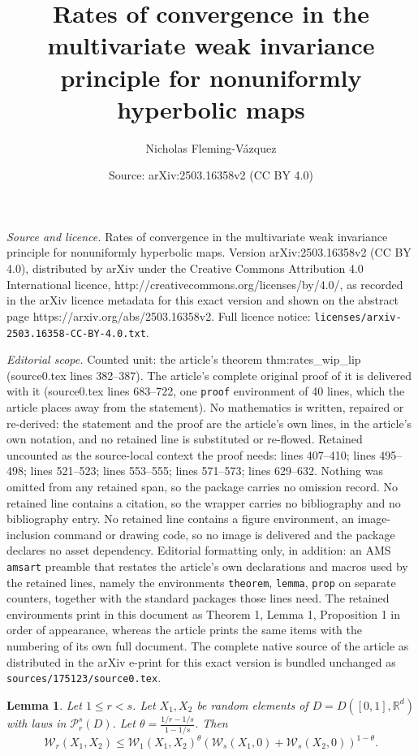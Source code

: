 \documentclass[10pt,a4paper]{amsart}
\title{Rates of convergence in the multivariate weak invariance principle for nonuniformly hyperbolic maps}
\author{Nicholas Fleming-V\'azquez}
\date{Source: arXiv:2503.16358v2 (CC BY 4.0)}
\newtheorem{lemma}{Lemma}
\newcommand{\R}{\ensuremath{\mathbb{R}}}%
\newcommand{\wass}{\mathcal{W}}
\begin{document}
\maketitle

\noindent\emph{Source and licence.} Rates of convergence in the multivariate weak invariance principle for nonuniformly hyperbolic maps. Version arXiv:2503.16358v2 (CC BY 4.0), distributed by arXiv under the Creative Commons Attribution 4.0 International licence, http://creativecommons.org/licenses/by/4.0/, as recorded in the arXiv licence metadata for this exact version and shown on the abstract page https://arxiv.org/abs/2503.16358v2. Full licence notice: \texttt{licenses/arxiv-2503.16358-CC-BY-4.0.txt}.\par\smallskip

\noindent\textit{Editorial scope.} Counted unit: the article's theorem thm:rates\_wip\_lip (source0.tex lines 382--387). The article's complete original proof of it is delivered with it (source0.tex lines 683--722, one \texttt{proof} environment of 40 lines, which the article places away from the statement). No mathematics is written, repaired or re-derived: the statement and the proof are the article's own lines, in the article's own notation, and no retained line is substituted or re-flowed.  Retained uncounted as the source-local context the proof needs: lines 407--410; lines 495--498; lines 521--523; lines 553--555; lines 571--573; lines 629--632.  Nothing was omitted from any retained span, so the package carries no omission record.  No retained line contains a citation, so the wrapper carries no bibliography and no bibliography entry.  No retained line contains a figure environment, an image-inclusion command or drawing code, so no image is delivered and the package declares no asset dependency.  Editorial formatting only, in addition: an AMS \texttt{amsart} preamble that restates the article's own declarations and macros used by the retained lines, namely the environments \texttt{theorem}, \texttt{lemma}, \texttt{prop} on separate counters, together with the standard packages those lines need.  The retained environments print in this document as Theorem 1, Lemma 1, Proposition 1 in order of appearance, whereas the article prints the same items with the numbering of its own full document.  The complete native source of the article as distributed in the arXiv e-print for this exact version is bundled unchanged as \texttt{sources/175123/source0.tex}.
	\begin{lemma}\label{lem:wasserstein_interpolation}
	Let $1\le r< s$. Let $X_1,X_2$ be random elements of $D=D([0,1],\R^d)$ with laws in $ \mathcal{P}_r^s(D)$. Let $\theta = \frac{1/r-1/s}{1-1/s}$. Then 
	\[ \wass_r(X_1,X_2) \le \wass_1(X_1,X_2)^{\theta}(\wass_s(X_1,0)+\wass_s(X_2,0))^{1-\theta}. \]
\end{lemma}
\end{document}
